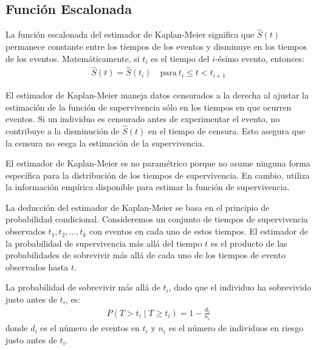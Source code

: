 \documentclass[a4paper]{report} %
\begin{document}
\subsection*{Funci\'on Escalonada}
La funci\'on escalonada del estimador de Kaplan-Meier significa que $\hat{S}(t)$ permanece constante entre los tiempos de los eventos y disminuye en los tiempos de los eventos. Matem\'aticamente, si $t_i$ es el tiempo del $i$-\'esimo evento, entonces:
\begin{eqnarray*}
\hat{S}(t) = \hat{S}(t_i) \quad \text{para} \ t_i \leq t < t_{i+1}
\end{eqnarray*}

El estimador de Kaplan-Meier maneja datos censurados a la derecha al ajustar la estimaci\'on de la funci\'on de supervivencia s\'olo en los tiempos en que ocurren eventos. Si un individuo es censurado antes de experimentar el evento, no contribuye a la disminuci\'on de $\hat{S}(t)$ en el tiempo de censura. Esto asegura que la censura no sesga la estimaci\'on de la supervivencia.

El estimador de Kaplan-Meier es no param\'etrico porque no asume ninguna forma espec\'ifica para la distribuci\'on de los tiempos de supervivencia. En cambio, utiliza la informaci\'on emp\'irica disponible para estimar la funci\'on de supervivencia.

La deducci\'on del estimador de Kaplan-Meier se basa en el principio de probabilidad condicional. Consideremos un conjunto de tiempos de supervivencia observados $t_1, t_2, \ldots, t_k$ con eventos en cada uno de estos tiempos. El estimador de la probabilidad de supervivencia m\'as all\'a del tiempo $t$ es el producto de las probabilidades de sobrevivir m\'as all\'a de cada uno de los tiempos de evento observados hasta $t$.

La probabilidad de sobrevivir m\'as all\'a de $t_i$, dado que el individuo ha sobrevivido justo antes de $t_i$, es:
\begin{eqnarray*}
P(T > t_i \mid T \geq t_i) = 1 - \frac{d_i}{n_i}
\end{eqnarray*}
donde $d_i$ es el n\'umero de eventos en $t_i$ y $n_i$ es el n\'umero de individuos en riesgo justo antes de $t_i$.
\end{document}
